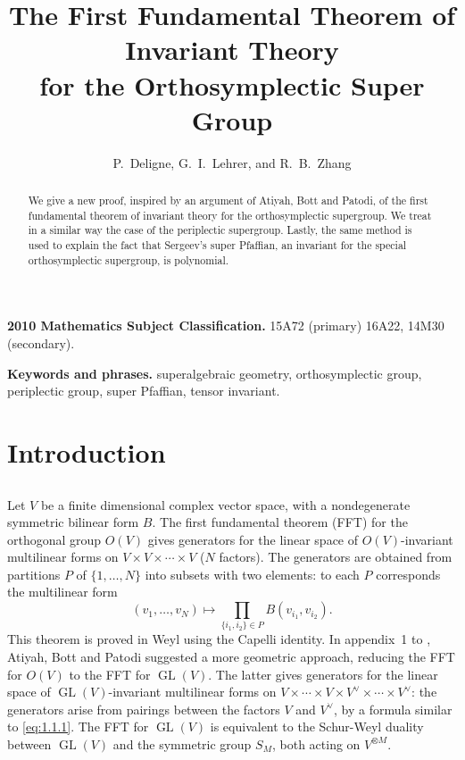\documentclass[11pt,a4paper]{article}
\title{\textbf{The First Fundamental Theorem of Invariant Theory\\for the Orthosymplectic Super Group}}
\author{P.~Deligne, G.~I.~Lehrer, and R.~B.~Zhang}
\date{}
\theoremstyle{plain}
\theoremstyle{definition}
\DeclareMathOperator{\GL}{GL}
\begin{document}
\maketitle

\begin{abstract}
We give a new proof, inspired by an argument of Atiyah, Bott and Patodi, of the first fundamental theorem of invariant theory for the orthosymplectic supergroup. We treat in a similar way the case of the periplectic supergroup. Lastly, the same method is used to explain the fact that Sergeev's super Pfaffian, an invariant for the special orthosymplectic supergroup, is polynomial.
\end{abstract}

\noindent\textbf{2010 Mathematics Subject Classification.} 15A72 (primary) 16A22, 14M30 (secondary).

\smallskip
\noindent\textbf{Keywords and phrases.} superalgebraic geometry, orthosymplectic group, periplectic group, super Pfaffian, tensor invariant.

\tableofcontents

\section{Introduction}

\subsection{}
Let $V$ be a finite dimensional complex vector space, with a nondegenerate symmetric bilinear form $B$. The first fundamental theorem (FFT) for the orthogonal group $O(V)$ gives generators for the linear space of $O(V)$-invariant multilinear forms on $V \times V \times \cdots \times V$ ($N$ factors). The generators are obtained from partitions $P$ of $\{1,\dots,N\}$ into subsets with two elements: to each $P$ corresponds the multilinear form
\begin{equation}\label{eq:1.1.1}
(v_1, \dots, v_N) \mapsto \prod_{\{i_1, i_2\} \in P} B(v_{i_1}, v_{i_2}).
\end{equation}
This theorem is proved in Weyl \cite{Weyl46} using the Capelli identity. In appendix~1 to \cite{ABP73}, Atiyah, Bott and Patodi suggested a more geometric approach, reducing the FFT for $O(V)$ to the FFT for $\GL(V)$. The latter gives generators for the linear space of $\GL(V)$-invariant multilinear forms on $V \times \cdots \times V \times V^\vee \times \cdots \times V^\vee$: the generators arise from pairings between the factors $V$ and $V^\vee$, by a formula similar to \eqref{eq:1.1.1}. The FFT for $\GL(V)$ is equivalent to the Schur-Weyl duality between $\GL(V)$ and the symmetric group $S_M$, both acting on $V^{\otimes M}$.
\end{document}
